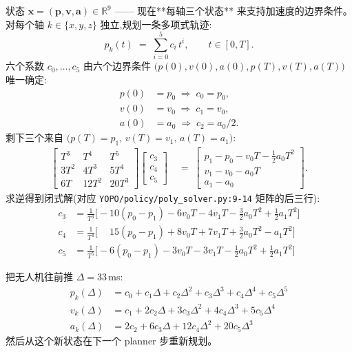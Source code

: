 \documentclass[UTF8, 11pt]{ctexart}
\newcommand{\R}{\mathbb{R}}
\begin{document}
状态 $\bm{x} = (\bm{p}, \bm{v}, \bm{a}) \in \R^9$ —— 现在**每轴三个状态**
来支持加速度的边界条件。对每个轴 $k \in \{x, y, z\}$ 独立,规划一条多项式轨迹:
\begin{equation}\label{eq:poly5}
p_k(t) \;=\; \sum_{i=0}^{5} c_i\, t^{i}, \qquad t \in [0, T].
\end{equation}
六个系数 $c_0,\dots,c_5$ 由六个边界条件 $\bigl(p(0), v(0), a(0), p(T), v(T), a(T)\bigr)$ 唯一确定:
\begin{align}
p(0) &= p_0 \;\Longrightarrow\; c_0 = p_0,\\
v(0) &= v_0 \;\Longrightarrow\; c_1 = v_0,\\
a(0) &= a_0 \;\Longrightarrow\; c_2 = a_0 / 2.
\end{align}
剩下三个来自 $\bigl(p(T)=p_1,\, v(T)=v_1,\, a(T)=a_1\bigr)$:
\begin{align}
\begin{bmatrix} T^3 & T^4 & T^5 \\ 3T^2 & 4T^3 & 5T^4 \\ 6T & 12T^2 & 20T^3 \end{bmatrix}
\begin{bmatrix} c_3 \\ c_4 \\ c_5 \end{bmatrix}
&\;=\;
\begin{bmatrix} p_1 - p_0 - v_0 T - \tfrac{1}{2} a_0 T^2 \\ v_1 - v_0 - a_0 T \\ a_1 - a_0 \end{bmatrix}.
\end{align}
求逆得到闭式解(对应 \texttt{YOPO/policy/poly\_solver.py:9-14} 矩阵的后三行):
\begin{align}
c_3 &= \tfrac{1}{T^3}\!\bigl[-10(p_0 - p_1) - 6 v_0 T - 4 v_1 T - \tfrac{3}{2} a_0 T^2 + \tfrac{1}{2} a_1 T^2\bigr]\\
c_4 &= \tfrac{1}{T^4}\!\bigl[\phantom{-}15(p_0 - p_1) + 8 v_0 T + 7 v_1 T + \tfrac{3}{2} a_0 T^2 - a_1 T^2\bigr]\\
c_5 &= \tfrac{1}{T^5}\!\bigl[-6(p_0 - p_1) - 3 v_0 T - 3 v_1 T - \tfrac{1}{2} a_0 T^2 + \tfrac{1}{2} a_1 T^2\bigr]
\end{align}

把无人机往前推 $\Delta = 33\,$ms:
\begin{align}
p_k(\Delta) &= c_0 + c_1\Delta + c_2 \Delta^2 + c_3 \Delta^3 + c_4 \Delta^4 + c_5 \Delta^5\\
v_k(\Delta) &= c_1 + 2 c_2\Delta + 3 c_3 \Delta^2 + 4 c_4 \Delta^3 + 5 c_5 \Delta^4\\
a_k(\Delta) &= 2 c_2 + 6 c_3\Delta + 12 c_4 \Delta^2 + 20 c_5 \Delta^3
\end{align}
然后从这个新状态在下一个 planner 步重新规划。
\end{document}
